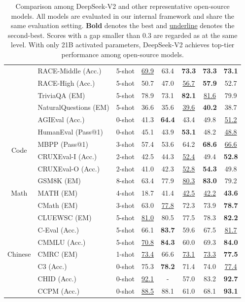 \documentclass[11pt, a4paper, logo, copyright, nonumbering]{deepseek}
\newcommand{\dsvii}{DeepSeek-V2}
\begin{document}
\begin{CJK*}{UTF8}{gbsn}
\begin{table}[!t]
\begin{tabular}{@{}c l c | c | c c c | c@{}}
    & RACE-Middle (Acc.) & 5-shot & \underline{69.9} & 63.4 & \textbf{73.3} & \textbf{73.3} & \textbf{73.1} \\
    & RACE-High (Acc.) & 5-shot & 50.7 & 47.0 & \underline{56.7} & \textbf{57.9} & 52.7 \\
    & TriviaQA (EM) & 5-shot & 78.9 & 73.1 & \textbf{82.1} & \underline{81.6} & 79.9 \\
    & NaturalQuestions (EM) & 5-shot & 36.6 & 35.6 & \underline{39.6} & \textbf{40.2} & 38.7 \\
    & AGIEval (Acc.) & 0-shot & 41.3 & \textbf{64.4} & 43.4 & 49.8 & \underline{51.2} \\
    \midrule
    \multirow{4}{*}{Code} & HumanEval (Pass@1) & 0-shot & 45.1 & 43.9 & \textbf{53.1} & 48.2 & \underline{48.8} \\
    & MBPP (Pass@1) & 3-shot & 57.4 & 53.6 & 64.2 & \textbf{68.6} & \underline{66.6} \\
    & CRUXEval-I (Acc.) & 2-shot & 42.5 & 44.3 & \underline{52.4} & 49.4 & \textbf{52.8} \\
    & CRUXEval-O (Acc.) & 2-shot & 41.0 & 42.3 & \underline{52.8} & \textbf{54.3} & 49.8 \\
    \midrule
    \multirow{3}{*}{Math} & GSM8K (EM) & 8-shot & 63.4 & 77.9 & \underline{80.3} & \textbf{83.0} & 79.2 \\
    & MATH (EM) & 4-shot & 18.7 & 41.4 & \underline{42.5} & \underline{42.2} & \textbf{43.6} \\
    & CMath (EM) & 3-shot & 63.0 & \underline{77.8} & 72.3 & 73.9 & \textbf{78.7} \\
    \midrule
    \multirow{7}{*}{Chinese} & CLUEWSC (EM) & 5-shot & \underline{81.0} & 80.5 & 77.5 & 78.3 & \textbf{82.2} \\
    & C-Eval (Acc.) & 5-shot & 66.1 & \textbf{83.7} & 59.6 & 67.5 & \underline{81.7} \\
    & CMMLU (Acc.) & 5-shot & \underline{70.8} & \textbf{84.3} & 60.0 & 69.3 & \textbf{84.0} \\
    & CMRC (EM) & 1-shot & \underline{73.4} & 66.6 & \underline{73.1} & \underline{73.3} & \textbf{77.5} \\
    & C3 (Acc.) & 0-shot & 75.3 & \textbf{78.2} & 71.4 & 74.0 & \underline{77.4} \\
    & CHID (Acc.)  & 0-shot & \underline{92.1} & - & 57.0 & 83.2 & \textbf{92.7} \\
    & CCPM (Acc.) & 0-shot & \underline{88.5} & 88.1 & 61.0 & 68.1 & \textbf{93.1} \\
    \bottomrule
    \end{tabular}
    \caption{
    Comparison among \dsvii{} and other representative open-source models.
    All models are evaluated in our internal framework and share the same evaluation setting.
    \textbf{Bold} denotes the best and \underline{underline} denotes the second-best. 
    Scores with a gap smaller than 0.3 are regarded as at the same level. 
    With only 21B activated parameters, \dsvii{} achieves top-tier performance among open-source models. 
    }
    \label{tab:main}
\end{table}


\end{CJK*}
\end{document}

